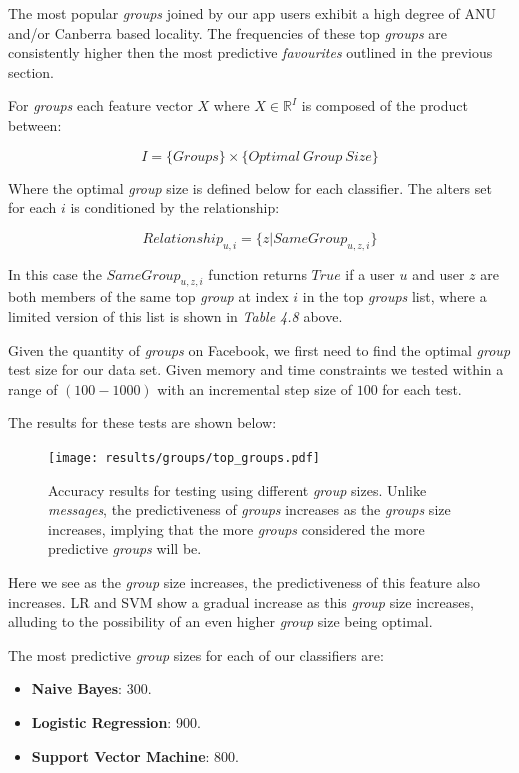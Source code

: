 \clearpage

The most popular \emph{groups} joined by our app users exhibit a high degree of ANU and/or Canberra based locality. The 
frequencies of these top \emph{groups} are consistently higher then the most predictive \emph{favourites} outlined in the previous section.

For \emph{groups} each feature vector $X$ where $X \in \mathbb{R}^I$ is composed of the product between:

\[ I = \{Groups\} \times \{Optimal \ Group \ Size\} \]

Where the optimal \emph{group} size is defined below for each classifier. 
The alters set for each $i$ is conditioned by the relationship:

\[ Relationship_{u,i} = \{z | SameGroup_{u,z,i}\} \]

In this case the $SameGroup_{u,z,i}$ function returns $True$ if a user $u$ and user $z$ are both members of the same top \emph{group} at index $i$ in the top \emph{groups} list, 
where a limited version of this list is shown in \emph{Table 4.8} above.

Given the quantity of \emph{groups} on Facebook, we first need to find the optimal \emph{group} test size for our data set. 
Given memory and time constraints we tested within a range of $(100-1000)$ with an incremental step size of $100$ for each test.

The results for these tests are shown below:

\begin{figure}[htb!]
	\begin{center}
		\texttt{[image: results/groups/top\_groups.pdf]}
		\caption{Accuracy results for testing using different \emph{group} sizes. Unlike \emph{messages},
				 the predictiveness of \emph{groups} increases as the \emph{groups} size increases, implying that the more \emph{groups} considered the more 
				 predictive \emph{groups} will be.}
	\end{center}
\end{figure}

\clearpage

Here we see as the \emph{group} size increases, the predictiveness of this feature also increases. LR and SVM show a gradual increase 
as this \emph{group} size increases, alluding to the possibility of an even higher \emph{group} size being optimal.

The most predictive \emph{group} sizes for each of our classifiers are:
\begin{itemize}
\item \textbf{Naive Bayes}: 300.
\item \textbf{Logistic Regression}: 900.
\item \textbf{Support Vector Machine}: 800.
\end{itemize}

